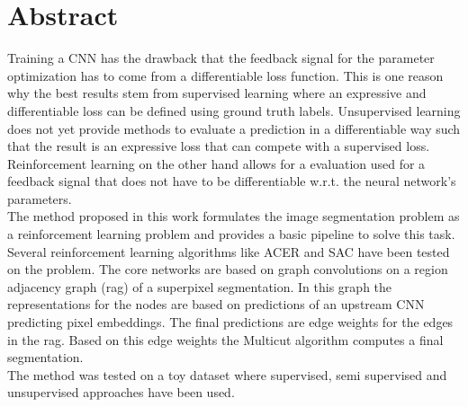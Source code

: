 \section*{Abstract}
Training a CNN has the drawback that the feedback signal for the parameter optimization has to come from a differentiable loss function. This is one reason why the best results stem from supervised learning where an expressive and differentiable loss can be defined using ground truth labels. Unsupervised learning does not yet provide methods to evaluate a prediction in a differentiable way such that the result is an expressive loss that can compete with a supervised loss.\\
Reinforcement learning on the other hand allows for a evaluation used for a feedback signal that does not have to be differentiable w.r.t. the neural network's parameters.\\
The method proposed in this work formulates the image segmentation problem as a reinforcement learning problem and provides a basic pipeline to solve this task.\\
Several reinforcement learning algorithms like ACER \cite{wang2016sample} and SAC \cite{haarnoja2018soft} have been tested on the problem. The core networks are based on graph convolutions on a region adjacency graph (rag) of a superpixel segmentation. In this graph the representations for the nodes are based on predictions of an upstream CNN predicting pixel embeddings. The final predictions are edge weights for the edges in the rag. Based on this edge weights the Multicut algorithm computes a final segmentation.\\
The method was tested on a toy dataset where supervised, semi supervised and unsupervised approaches have been used.